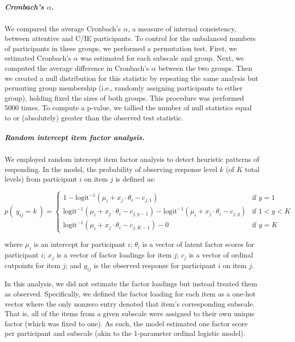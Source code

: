 \documentclass[a4paper,notitlepage,12pt]{article}
\begin{document}
\begin{refsection}[main]
\subparagraph{Cronbach's $\alpha$.} We compared the average Cronbach's $\alpha$, a measure of internal consistency, between attentive and C/IE participants. To control for the unbalanced numbers of participants in these groups, we performed a permutation test. First, we estimated Cronbach's $\alpha$ was estimated for each subscale and group. Next, we computed the average difference in Cronbach's $\alpha$ between the two groups. Then we created a null distribution for this statistic by repeating the same analysis but permuting group membership (i.e., randomly assigning participants to either group), holding fixed the sizes of both groups. This procedure was performed 5000 times. To compute a p-value, we tallied the number of null statistics equal to or (absolutely) greater than the observed test statistic. 

\subparagraph{Random intercept item factor analysis.} We employed random intercept item factor analysis \cite{maydeu2006random} to detect heuristic patterns of responding. In the model, the probability of observing response level $k$ (of $K$ total levels) from participant $i$ on item $j$ is defined as:

\begin{equation*}
    p( \ y_{ij} = k \ ) = \left\{ \begin{array}{ll}
1 - \text{logit}^{-1}( \mu_i + x_j\cdot \theta_i - c_{j,1})  &  \text{if } y = 1 \\[4pt]
\text{logit}^{-1}( \mu_i + x_j\cdot \theta_i - c_{j,y-1}) - \text{logit}^{-1}( \mu_i + x_j\cdot \theta_i - c_{j,y}) & \text{if } 1 < y < K \\[4pt]
\text{logit}^{-1}( \mu_i + x_j\cdot \theta_i - c_{j,K-1}) - 0  &  \text{if } y = K
\end{array} \right.
\end{equation*}

where $\mu_i$ is an intercept for participant $i$; $\theta_i$ is a vector of latent factor scores for participant $i$; $x_j$ is a vector of factor loadings for item $j$; $c_j$ is a vector of ordinal cutpoints for item $j$; and $y_{ij}$ is the observed response for participant $i$ on item $j$.

In this analysis, we did not estimate the factor loadings but instead treated them as observed. Specifically, we defined the factor loading for each item as a one-hot vector where the only nonzero entry denoted that item's corresponding subscale. That is, all of the items from a given subscale were assigned to their own unique factor (which was fixed to one). As such, the model estimated one factor score per participant and subscale (akin to the 1-parameter ordinal logistic model).


\end{refsection}
\end{document}
